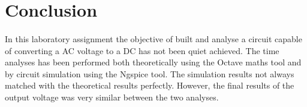 \section{Conclusion}
\label{sec:conclusion}

\paragraph{} In this laboratory assignment the objective of built and analyse a circuit capable of
converting a AC voltage to a DC has not been quiet
achieved. The time analyses has been performed both
theoretically using the Octave maths tool and by circuit simulation using the
Ngspice tool. The simulation results not always matched with the theoretical results perfectly.
However, the final results of the output voltage was very similar between the two analyses.



